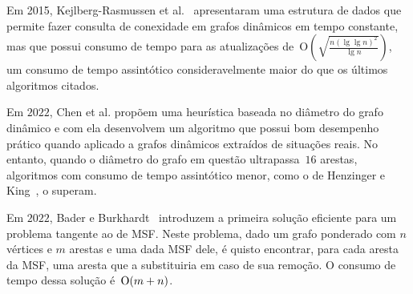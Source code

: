 Em 2015, Kejlberg-Rasmussen et al.~\cite{kejlbergrasmussen_et_al} apresentaram uma estrutura de dados que permite fazer consulta de conexidade em grafos dinâmicos em tempo constante, mas que possui consumo de tempo para as atualizações de~$\mathrm{O}\left(\sqrt{\frac{n\left(\lg \lg n\right)^2}{\lg n}}\right)$, um consumo de tempo assintótico consideravelmente maior do que os últimos algoritmos citados.

Em $2022$, Chen et al. \cite{QC22} propõem uma heurística baseada no diâmetro do grafo dinâmico e com ela desenvolvem um algoritmo que possui bom desempenho prático quando aplicado a grafos dinâmicos extraídos de situações reais.
No entanto, quando o diâmetro do grafo em questão ultrapassa~$16$ arestas, algoritmos com consumo de tempo assintótico menor, como o de Henzinger e King~\cite{HenzingerKing}, o superam.

Em $2022$, Bader e Burkhardt~\cite{simpleAndEfficient2022} introduzem a primeira solução eficiente para um problema tangente ao de MSF. Neste problema, dado um grafo ponderado com $n$ vértices e $m$ arestas e uma dada MSF dele, é quisto encontrar, para cada aresta da MSF, uma aresta que a substituiria em caso de sua remoção. O consumo de tempo dessa solução é~$\mathrm{O}(m+n)$.
